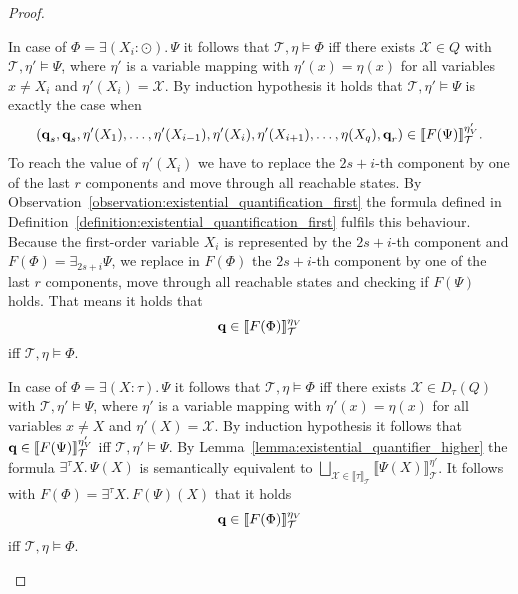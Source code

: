 \begin{proof}
\begin{compactitem}
        \item In case of $\Phi = \exists (X_i\colon \odot).\,\Psi$ it follows that $\mathcal{T}, \eta \models \Phi$ iff
        there exists  $\mathcal{X} \in Q$ with $\mathcal{T}, \eta' \models \Psi$, where $\eta'$ is a variable mapping with $\eta'(x) = \eta(x)$ for all variables $x \neq X_i$ and $\eta'(X_i) = \mathcal{X}$. By induction hypothesis it holds that $\mathcal{T}, \eta' \models \Psi$ is exactly the case when
        \begin{align*}
            (\emph{q}_s, \emph{q}_s, \eta'(X_1), \dots, \eta'(X_{i-1}), \eta'(X_i), \eta'(X_{i+1}), \dots, \eta(X_{q}), \emph{q}_r) \in
            \llbracket F(\Psi) \rrbracket^{{\eta'_V}}_\mathcal{T}.
        \end{align*}
        To reach the value of $\eta'(X_i)$ we have to replace the $2s+i$-th component by one of 
        the last $r$ components and move through all reachable states. By Observation~\ref{observation:existential_quantification_first} the formula defined in Definition~\ref{definition:existential_quantification_first} fulfils this behaviour. Because the first-order variable $X_i$ is represented by the $2s+i$-th component and $F(\Phi) = \exists_{2s+i} \Psi$, we replace in $F(\Phi)$ the $2s+i$-th component by one of the last $r$ components, move through all reachable states and checking if $F(\Psi)$ holds. That means it holds that
        \[\emph{q} \in \llbracket F
        (\Phi) \rrbracket^{\eta_V}_\mathcal{T}\]
        iff $\mathcal{T}, \eta \models \Phi$.

        \item In case of $\Phi = \exists (X \colon \tau).\,\Psi$ it follows that $\mathcal{T}, \eta \models \Phi$ iff
        there exists $\mathcal{X} \in D_\tau(Q)$ with $\mathcal{T}, \eta' \models \Psi$, where $\eta'$ is a variable mapping with $\eta'(x) = \eta(x)$ for all variables $x \neq X$ and $\eta'(X) = \mathcal{X}$.
        By induction hypothesis it follows that $\emph{q} \in
        \llbracket F(\Psi) \rrbracket^{{\eta'_V}}_\mathcal{T}$ iff $\mathcal{T}, \eta' \models \Psi$. By Lemma~\ref{lemma:existential_quantifier_higher} the formula $\exists^\tau X.\, \Psi(X)$ is semantically equivalent to
        $\underset{\mathcal{X} \in \llbracket \tau \rrbracket_\mathcal{T}}{\bigsqcup} \llbracket \Psi(X) \rrbracket^{\eta'}_\mathcal{T}$.
        It follows with $F(\Phi) = \exists^\tau X.\, F(\Psi)(X)$ that it holds \[\emph{q} \in
        \llbracket F(\Phi) \rrbracket^{\eta_V}_\mathcal{T}\]
        iff $\mathcal{T},\eta \models \Phi$.
        

\end{compactitem}
\end{proof}
